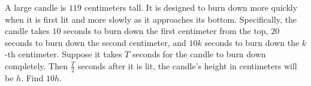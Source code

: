 A large candle is $119$ centimeters tall.  It is designed to burn down more quickly when it is first lit and more slowly as it approaches its bottom.  Specifically, the candle takes $10$ seconds to burn down the first centimeter from the top, $20$ seconds to burn down the second centimeter, and $10k$ seconds to burn down the $k$-th centimeter.  Suppose it takes $T$ seconds for the candle to burn down completely.  Then $\tfrac{T}{2}$ seconds after it is lit, the candle's height in centimeters will be $h$.  Find $10h$.